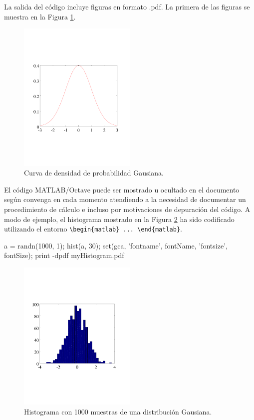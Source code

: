 \documentclass{article}
\newenvironment{matlab}{\comment}{\endcomment}
\begin{document}
La salida del código incluye figuras en formato .pdf. La primera de las figuras se muestra en la Figura \ref{fig:one}.

\begin{figure}
\centerline{\includegraphics[width=0.5\textwidth]{myGaussian}}
\caption{Curva de densidad de probabilidad Gausiana.}\label{fig:one}
\end{figure}

El código MATLAB/Octave puede ser mostrado u ocultado en el documento según convenga en cada momento atendiendo a la necesidad de documentar un procedimiento de cálculo e incluso por motivaciones de depuración del código.
A modo de ejemplo, el histograma mostrado en la Figura \ref{fig:two}  ha sido codificado utilizando el entorno \texttt{\textbackslash begin\{matlab\} ... \textbackslash end\{matlab\}}.

\begin{matlab}
a = randn(1000, 1);
hist(a, 30);
set(gca, 'fontname', fontName, 'fontsize', fontSize);
print -dpdf myHistogram.pdf
\end{matlab}

\begin{figure}
\centerline{\includegraphics[width=0.5\textwidth]{myHistogram}}
\caption{Histograma con 1000 muestras de una distribución Gausiana.}\label{fig:two}
\end{figure}
\end{document}
